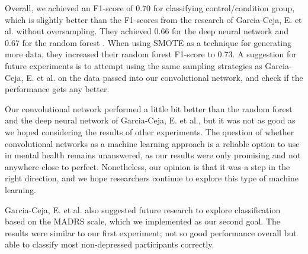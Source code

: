 Overall, we achieved an F1-score of 0.70 for classifying control/condition group, which is slightly better than the F1-scores from the research of Garcia-Ceja, E. et al. without oversampling. They achieved 0.66 for the deep neural network and 0.67 for the random forest \cite{GarciaCeja2018_classification_bipolar}. When using SMOTE as a technique for generating more data, they increased their random forest F1-score to 0.73. A suggestion for future experiments is to attempt using the same sampling strategies as Garcia-Ceja, E. et al. on the data passed into our convolutional network, and check if the performance gets any better. 

Our convolutional network performed a little bit better than the random forest and the deep neural network of Garcia-Ceja, E. et al., but it was not as good as we hoped considering the results of other experiments. The question of whether convolutional networks as a machine learning approach is a reliable option to use in mental health remains unanswered, as our results were only promising and not anywhere close to perfect. Nonetheless, our opinion is that it was a step in the right direction, and we hope researchers continue to explore this type of machine learning.

Garcia-Ceja, E. et al. also suggested future research to explore classification based on the MADRS scale, which we implemented as our second goal. The results were similar to our first experiment; not so good performance overall but able to classify most non-depressed participants correctly. 

